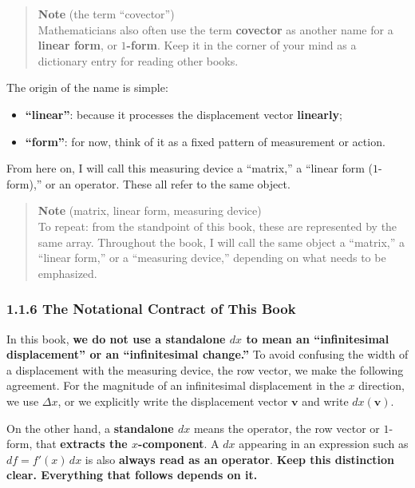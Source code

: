\documentclass[a4paper,12pt,openany]{book}
\begin{document}
\begin{quote}
\textbf{Note} (the term ``covector'')\\
Mathematicians also often use the term \textbf{covector} as another name
for a \textbf{linear form}, or \textbf{$1$-form}. Keep it in the corner
of your mind as a dictionary entry for reading other books.
\end{quote}

The origin of the name is simple:

\begin{itemize}
\item
  \textbf{“linear”}: because it processes the displacement vector
  \textbf{linearly};
\item
  \textbf{“form”}: for now, think of it as a fixed pattern of
  measurement or action.
\end{itemize}

From here on, I will call this measuring device a ``matrix,'' a ``linear
form (\(1\)-form),'' or an operator. These all refer to the same object.

\begin{quote}
\textbf{Note} (matrix, linear form, measuring device)\\
To repeat: from the standpoint of this book, these are represented by
the same array. Throughout the book, I will call the same object a
``matrix,'' a ``linear form,'' or a ``measuring device,'' depending on
what needs to be emphasized.
\end{quote}

\hypertarget{the-notational-contract-of-this-book}{%
\subsubsection{1.1.6 The Notational Contract of This
Book}\label{the-notational-contract-of-this-book}}

In this book,
\textbf{we do not use a standalone $dx$ to mean an “infinitesimal displacement” or an “infinitesimal change.”}
To avoid confusing the width of a displacement with the measuring
device, the row vector, we make the following agreement. For the
magnitude of an infinitesimal displacement in the \(x\) direction, we
use \(\Delta x\), or we explicitly write the displacement vector
\(\mathbf{v}\) and write \(dx(\mathbf{v})\).

On the other hand, a \textbf{standalone $dx$} means the operator, the
row vector or \(1\)-form, that \textbf{extracts the $x$-component}. A
\(dx\) appearing in an expression such as \(df=f'(x)\,dx\) is also
\textbf{always read as an operator}.
\textbf{Keep this distinction clear. Everything that follows depends on it.}
\end{document}
